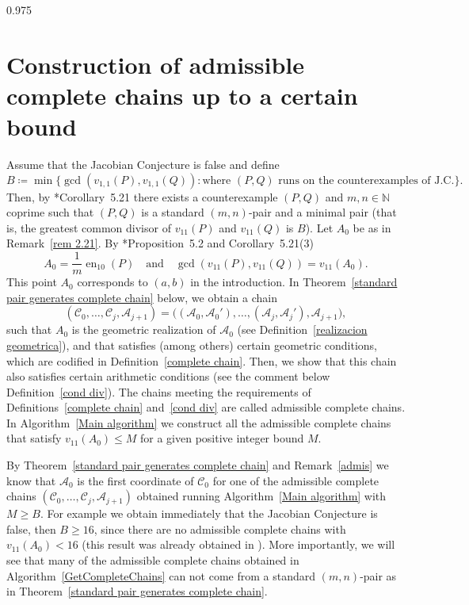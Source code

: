 \documentclass[reqno,a4paper,twoside]{amsart}
\theoremstyle{definition}
\theoremstyle{remark}
\DeclareMathOperator{\en}{en}
\begin{document}
\begin{spacing}{0.975}

\section{Construction of admissible complete chains up to a certain bound}

Assume that the Jacobian Conjecture is false and define
\begin{equation}\label{def B}
B\coloneqq \min\bigl\{\gcd(v_{1,1}(P),v_{1,1}(Q)):\text{where $(P,Q)$ runs on the counterexamples of J.C.}\bigr\}.
\end{equation}
Then, by \cite{GGV1}*{Corollary~5.21} there exists a counterexample $(P,Q)$ and $m,n\in \mathds{N}$ coprime such that $(P,Q)$ is a standard $(m,n)$-pair and a minimal pair (that is, the greatest common divisor of $v_{11}(P)$ and $v_{11}(Q)$ is $B$). Let $A_0$ be as in Remark~\ref{rem 2.21}. By \cite{GGV1}*{Proposition~5.2 and Corollary~5.21(3)}
$$
A_0 = \frac{1}{m}\en_{10}(P)  \quad\text{and}\quad \gcd(v_{11}(P),v_{11}(Q)) = v_{11}(A_0).
$$
This point $A_0$ corresponds to $(a,b)$ in the introduction. In Theorem~\ref{standard pair generates complete chain} below, we obtain a chain
\begin{equation*}
(\mathcal{C}_0,\dots,\mathcal{C}_j,\mathcal{A}_{j+1}) = \bigl((\mathcal{A}_0,\mathcal{A}_0'),\dots, (\mathcal{A}_j,\mathcal{A}_j'),\mathcal{A}_{j+1}\bigr),
\end{equation*}
such that $A_0$ is the geometric realization of $\mathcal{A}_0$ (see Definition~\ref{realizacion geometrica}), and that satisfies (among others) certain geometric conditions, which are codified in Definition~\ref{complete chain}. Then, we show that this chain also satisfies certain arithmetic conditions (see the comment below Definition~\ref{cond div}). The chains meeting the requirements of Definitions~\ref{complete chain} and~\ref{cond div} are called admissible complete chains. In Algorithm~\ref{Main algorithm} we construct all the admissible complete chains that satisfy $v_{11}(A_0)\le M$ for a given positive integer bound $M$.

By Theorem~\ref{standard pair generates complete chain}
and Remark~\ref{admis} we know that $\mathcal{A}_0$ is the first coordinate of $\mathcal{C}_0$ for one of the admissible complete chains $(\mathcal{C}_0,\dots,\mathcal{C}_j,\mathcal{A}_{j+1})$ obtained running Algorithm~\ref{Main algorithm} with $M \ge B$. For example we obtain immediately that the Jacobian Conjecture is false, then $B\ge 16$, since there are no admissible complete chains with $v_{11}(A_0)< 16$ (this result was already obtained in \cite{GGV1}). More importantly, we will see that many of the admissible complete chains obtained in Algorithm~\ref{GetCompleteChains} can not come from a standard $(m,n)$-pair as in Theorem~\ref{standard pair generates complete chain}.


\end{spacing}
\end{document}
